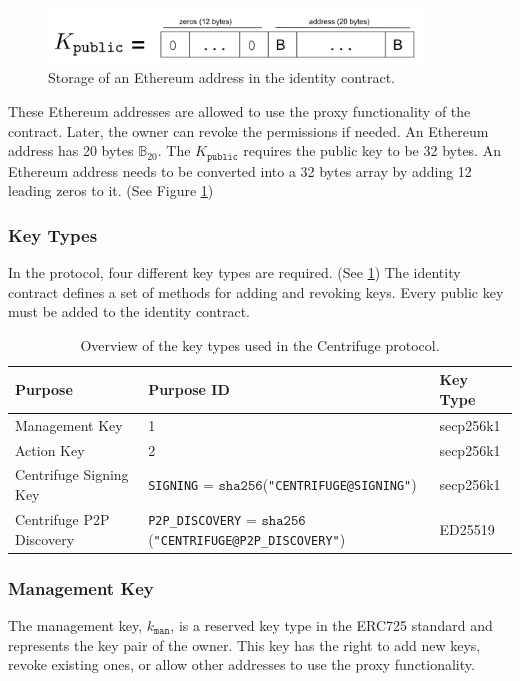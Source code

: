 \begin{figure}[thpb]
  \centering
  \includegraphics[width=10cm]{img/address.png}
  \caption{Storage of an Ethereum address in the identity contract.} 
  \label{fig:address}
\end{figure}

These Ethereum addresses are allowed to use the proxy functionality of the contract. Later, the owner can revoke the permissions if needed. An Ethereum address has 20 bytes $\mathbb{B}_{20}$. The $K_\texttt{public}$ requires the public key to be 32 bytes. An Ethereum address needs to be converted into a 32 bytes array by adding 12 leading zeros to it. (See Figure \ref{fig:address})

\subsubsection{Key Types}\label{sec:key_types}
In the protocol, four different key types are required. (See \ref{tab:keys}) The identity contract defines a set of methods for adding and revoking keys.  Every public key must be added to the identity contract.
\begin{table}[!htbp]
\label{tab:keys}%
\centering
\begin{tabular}{|l|l|l|}
\hline
 \textbf{Purpose}       & \textbf{Purpose ID} & \textbf{Key Type} \\ \hline
Management Key &      1      &          secp256k1 \\ \hline
Action Key    &      2      &            secp256k1     \\ \hline
Centrifuge Signing Key   &       \texttt{SIGNING} = $\mathtt{sha256}$(\texttt{"CENTRIFUGE@SIGNING"})     &            secp256k1    \\ \hline
Centrifuge P2P Discovery &    \texttt{P2P\_DISCOVERY} = $\mathtt{sha256}$(\texttt{"CENTRIFUGE@P2P\_DISCOVERY"})         &            ED25519 \\ \hline
\end{tabular}
\caption{Overview of the key types used in the Centrifuge protocol.}
\end{table}

\subsubsection{Management Key}
The management key, $k_\mathtt{man}$, is a reserved key type in the ERC725 standard and represents the key pair of the owner. This key has the right to add new keys, revoke existing ones, or allow other addresses to use the proxy functionality.
